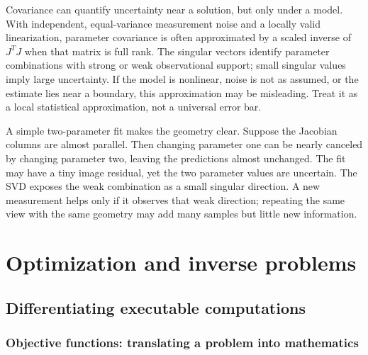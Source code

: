 Covariance can quantify uncertainty near a solution, but only under a model. With independent, equal-variance measurement noise and a locally valid linearization, parameter covariance is often approximated by a scaled inverse of \(J^TJ\) when that matrix is full rank. The singular vectors identify parameter combinations with strong or weak observational support; small singular values imply large uncertainty. If the model is nonlinear, noise is not as assumed, or the estimate lies near a boundary, this approximation may be misleading. Treat it as a local statistical approximation, not a universal error bar.

A simple two-parameter fit makes the geometry clear. Suppose the Jacobian columns are almost parallel. Then changing parameter one can be nearly canceled by changing parameter two, leaving the predictions almost unchanged. The fit may have a tiny image residual, yet the two parameter values are uncertain. The SVD exposes the weak combination as a small singular direction. A new measurement helps only if it observes that weak direction; repeating the same view with the same geometry may add many samples but little new information.

\section{Optimization and inverse problems}\label{02-foundations-ii-ch026-optimization-and-inverse-problems}

\hypertarget{02-foundations-ii-ch026-optimization-and-inverse-problems}{}

\subsection{Differentiating executable computations}\label{02-foundations-ii-ch026-differentiating-executable-computations}

\hypertarget{02-foundations-ii-ch026-differentiating-executable-computations}{}

\subsubsection{Objective functions: translating a problem into mathematics}\label{02-foundations-ii-ch026-objective-functions-translating-a-problem-into-mathematics}

\hypertarget{02-foundations-ii-ch026-objective-functions-translating-a-problem-into-mathematics}{}

